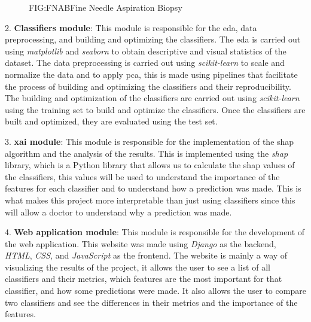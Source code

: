 \begin{figure}[Fine Needle Aspiration Biopsy]{FIG:FNAB}{Fine Needle Aspiration Biopsy \cite{sidey-gibbons_machine_2019}}
\end{figure}

2. \textbf{Classifiers module}: This module is responsible for the \ac{eda}, data preprocessing, and building and optimizing the classifiers. The \ac{eda} is carried out using \textit{matplotlib} and \textit{seaborn} to obtain descriptive and visual statistics of the dataset. The data preprocessing is carried out using \textit{scikit-learn} to scale and normalize the data and to apply \ac{pca}, this is made using pipelines that facilitate the process of building and optimizing the classifiers and their reproducibility. The building and optimization of the classifiers are carried out using \textit{scikit-learn} using the training set to build and optimize the classifiers. Once the classifiers are built and optimized, they are evaluated using the test set.

3. \textbf{\ac{xai} module}: This module is responsible for the implementation of the \ac{shap} algorithm and the analysis of the results. This is implemented using the \textit{shap} library, which is a Python library that allows us to calculate the \ac{shap} values of the classifiers, this values will be used to understand the importance of the features for each classifier and to understand how a prediction was made. This is what makes this project more interpretable than just using classifiers since this will allow a doctor to understand why a prediction was made.

4. \textbf{Web application module}: This module is responsible for the development of the web application. This website was made using \textit{Django} as the backend, \textit{HTML}, \textit{CSS}, and \textit{JavaScript} as the frontend. The website is mainly a way of visualizing the results of the project, it allows the user to see a list of all classifiers and their metrics, which features are the most important for that classifier, and how some predictions were made. It also allows the user to compare two classifiers and see the differences in their metrics and the importance of the features.

